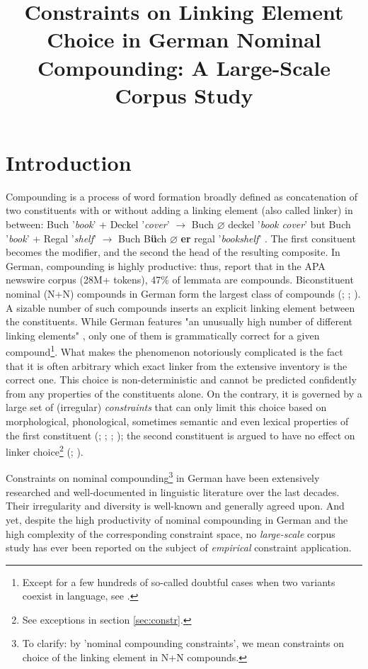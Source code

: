 \documentclass[10pt, a4paper]{article}
\title{Constraints on Linking Element Choice in German Nominal Compounding: A Large-Scale Corpus Study}
\newcommand{\zeroLinker}{\ensuremath{\boldsymbol{\varnothing}}}
\newcommand{\compEx}[7]{%
    #1 '\textit{#2}' + #4 '\textit{#5}'
    $\rightarrow$
    \if\relax\detokenize{#6}\relax
      #1%
    \else
      #6%
    \fi
    \if\relax\detokenize{#3}\relax
      \zeroLinker%
    \else
      \textbf{#3}%
    \fi
    \MakeLowercase{#4} '\textit{#7}'%
}
\begin{document}
\maketitleabstract



\section{Introduction}
\label{sec:intro}

Compounding is a process of word formation broadly defined as concatenation of two constituents with or without adding a linking element (also called linker) in between: \compEx{Buch}{book}{}{Deckel}{cover}{}{book cover} but \compEx{Buch}{book}{er}{Regal}{shelf}{B\textbf{ü}ch}{bookshelf}. The first consituent becomes the modifier, and the second the head of the resulting composite. In German, compounding is highly productive: thus, \citet{baroni_etal_2003} report that in the APA newswire corpus (28M+ tokens), 47\% of lemmata are compounds. Biconstituent nominal (N+N) compounds in German form the largest class of compounds (\citealp[53]{ortner_mueller-bollhagen_1991}; \citealp{scherer_2012}; \citealp{schluecker_2023}). A sizable number of such compounds inserts an explicit linking element between the constituents. While German features "an unusually high number of different linking elements" \citep{schaefer_pankratz_2018}, only one of them is grammatically correct for a given compound\footnote{Except for a few hundreds of so-called doubtful cases when two variants coexist in language, see \citep{nuebling_szczepaniak_2013}.}. What makes the phenomenon notoriously complicated is the fact that it is often arbitrary which exact linker from the extensive inventory is the correct one. This choice is non-deterministic and cannot be predicted confidently from any properties of the constituents alone. On the contrary, it is governed by a large set of (irregular) \textit{constraints} that can only limit this choice based on morphological, phonological, sometimes semantic and even lexical properties of the first constituent (\citealp[227]{eisenberg_2013}; \citealp{kuerschner_2005}; \citealp{libben_etal_2009}; \citealp{schaefer_pankratz_2018}); the second constituent is argued to have no effect on linker choice\footnote{See exceptions in section \ref{sec:constr}.} (\citealp{kuerschner_2005}; \citealp[56]{ortner_mueller-bollhagen_1991}).

Constraints on nominal compounding\footnote{To clarify: by 'nominal compounding constraints', we mean constraints on choice of the linking element in N+N compounds.} in German have been extensively researched and well-documented in linguistic literature over the last decades. Their irregularity and diversity is well-known and generally agreed upon. And yet, despite the high productivity of nominal compounding in German and the high complexity of the corresponding constraint space, no \textit{large-scale} corpus study has ever been reported on the subject of \textit{empirical} constraint application.
\end{document}
